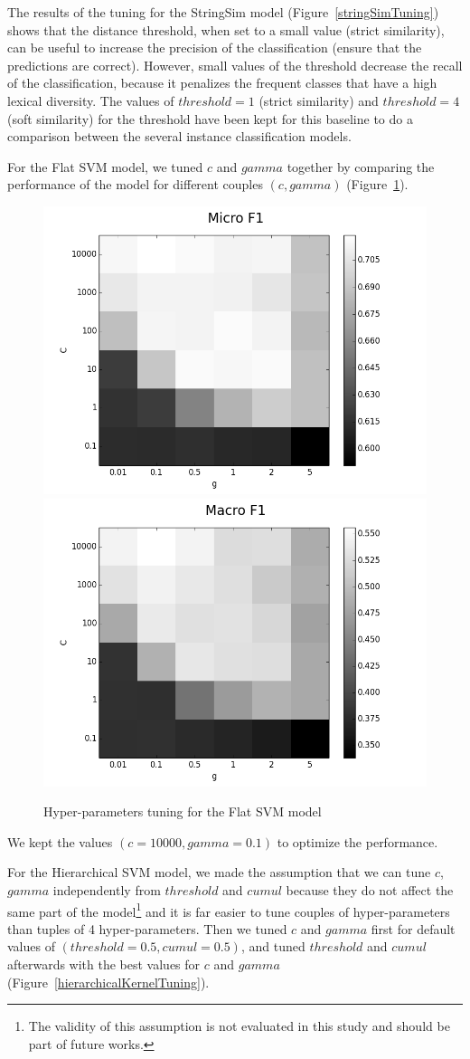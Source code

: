 \documentclass[12pt]{article}
\begin{document}
The results of the tuning for the StringSim model (Figure~\ref{stringSimTuning}) shows that the distance threshold, when set to a small value (strict similarity), can be useful to increase the precision of the classification (ensure that the predictions are correct). However, small values of the threshold decrease the recall of the classification, because it penalizes the frequent classes that have a high lexical diversity. The values of $threshold=1$ (strict similarity) and $threshold=4$ (soft similarity) for the threshold have been kept for this baseline to do a comparison between the several instance classification models.

For the Flat SVM model, we tuned $c$ and $gamma$ together by comparing the performance of the model for different couples $(c, gamma)$ (Figure~\ref{flatKernelTuning}).

\begin{figure}[!ht]
    \centering
    \includegraphics[width=0.5\linewidth]{Figures/Tuning_Figures/instanceClassification_flat_tuning_Micro_F1.png}\hfill
    \includegraphics[width=0.5\linewidth]{Figures/Tuning_Figures/instanceClassification_flat_tuning_Macro_F1.png}
    \caption{\label{flatKernelTuning} Hyper-parameters tuning for the Flat SVM model}
\end{figure}

We kept the values $(c=10000, gamma=0.1)$ to optimize the performance.

For the Hierarchical SVM model, we made the assumption that we can tune $c$, $gamma$ independently from $threshold$ and $cumul$ because they do not affect the same part of the model\footnote{The validity of this assumption is not evaluated in this study and should be part of future works.} and it is far easier to tune couples of hyper-parameters than tuples of 4 hyper-parameters. Then we tuned $c$ and $gamma$ first for default values of $(threshold=0.5, cumul=0.5)$, and tuned $threshold$ and $cumul$ afterwards with the best values for $c$ and $gamma$ (Figure~\ref{hierarchicalKernelTuning}).
\end{document}

